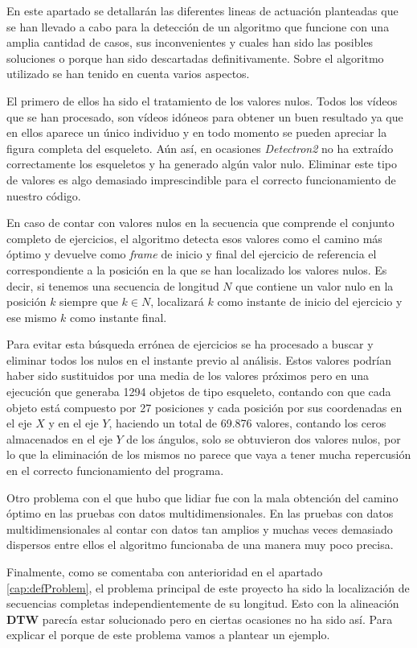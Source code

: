 En este apartado se detallarán las diferentes lineas de actuación planteadas que se han llevado a cabo para la detección de un algoritmo que funcione con una amplia cantidad de casos, sus inconvenientes y cuales han sido las posibles soluciones o porque han sido descartadas definitivamente. Sobre el algoritmo utilizado se han tenido en cuenta varios aspectos.

El primero de ellos ha sido el tratamiento de los valores nulos. Todos los vídeos que se han procesado, son vídeos idóneos para obtener un buen resultado ya que en ellos aparece un único individuo y en todo momento se pueden apreciar la figura completa del esqueleto. Aún así, en ocasiones \textit{Detectron2} no ha extraído correctamente los esqueletos y ha generado algún valor nulo. Eliminar este tipo de valores es algo demasiado imprescindible para el correcto funcionamiento de nuestro código. 

En caso de contar con valores nulos en la secuencia que comprende el conjunto completo de ejercicios, el algoritmo detecta esos valores como el camino más óptimo y devuelve como \textit{frame} de inicio y final del ejercicio de referencia el correspondiente a la posición en la que se han localizado los valores nulos. Es decir, si tenemos una secuencia de longitud $N$ que contiene un valor nulo en la posición $k$ siempre que $k \in N$, localizará $k$ como instante de inicio del ejercicio y ese mismo $k$ como instante final.

Para evitar esta búsqueda errónea de ejercicios se ha procesado a buscar y eliminar todos los nulos en el instante previo al análisis. Estos valores podrían haber sido sustituidos por una media de los valores próximos pero en una ejecución que generaba 1294 objetos de tipo esqueleto, contando con que cada objeto está compuesto por 27 posiciones y cada posición por sus coordenadas en el eje $X$ y en el eje $Y$, haciendo un total de 69.876 valores, contando los ceros almacenados en el eje $Y$ de los ángulos, solo se obtuvieron dos valores nulos, por lo que la eliminación de los mismos no parece que vaya a tener mucha repercusión en el correcto funcionamiento del programa. 

Otro problema con el que hubo que lidiar fue con la mala obtención del camino óptimo en las pruebas con datos multidimensionales. En las pruebas con datos multidimensionales al contar con datos tan amplios y muchas veces demasiado dispersos entre ellos el algoritmo funcionaba de una manera muy poco precisa. 

Finalmente, como se comentaba con anterioridad en el apartado \ref{cap:defProblem}, el problema principal de este proyecto ha sido la localización de secuencias completas independientemente de su longitud. Esto con la alineación \textbf{DTW} parecía estar solucionado pero en ciertas ocasiones no ha sido así. Para explicar el porque de este problema vamos a plantear un ejemplo. 

